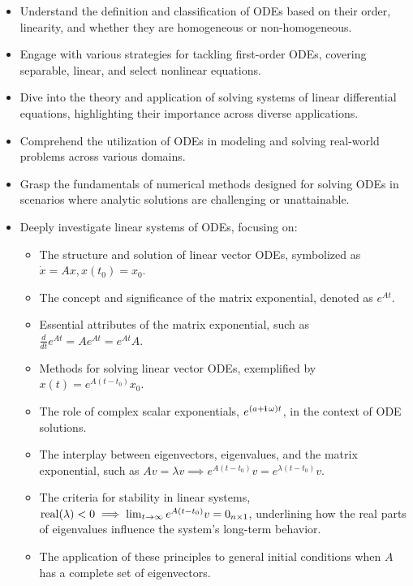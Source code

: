 \documentclass[letterpaper]{book}
\begin{document}
\begin{enumerate}[label={\large\arabic*}, font=\large]
\begin{itemize}
\item Understand the definition and classification of ODEs based on their order, linearity, and whether they are homogeneous or non-homogeneous.
\item Engage with various strategies for tackling first-order ODEs, covering separable, linear, and select nonlinear equations.
\item Dive into the theory and application of solving systems of linear differential equations, highlighting their importance across diverse applications.
\item Comprehend the utilization of ODEs in modeling and solving real-world problems across various domains.
\item Grasp the fundamentals of numerical methods designed for solving ODEs in scenarios where analytic solutions are challenging or unattainable.
\item Deeply investigate linear systems of ODEs, focusing on:
    \begin{itemize}
    \item The structure and solution of linear vector ODEs, symbolized as $\dot{x} = Ax, x(t_0) = x_0$.
    \item The concept and significance of the matrix exponential, denoted as $e^{At}$.
    \item Essential attributes of the matrix exponential, such as $\frac{d}{dt} e^{At} = A e^{At} =  e^{At} A$.
    \item Methods for solving linear vector ODEs, exemplified by $x(t) = e^{A(t-t_0)} x_0$.
    \item The role of complex scalar exponentials,  $e^{\left( a + \mathop{\bm{\mathrm i}} \omega \right) t}$,  in the context of ODE solutions.
    \item The interplay between eigenvectors, eigenvalues, and the matrix exponential, such as  $Av = \lambda v \implies  e^{A(t-t_0)} v = e^{\lambda(t-t_0)} v$.
    \item The criteria for stability in linear systems, ${\rm real} (\lambda) < 0 \implies \lim_{t\to \infty} e^{A(t-t_0)} v = 0_{n \times 1}$, underlining how the real parts of eigenvalues influence the system's long-term behavior.
    \item The application of these principles to general initial conditions when $A$ has a complete set of eigenvectors.        
    \end{itemize}    
\end{itemize}


\end{enumerate}
\end{document}
